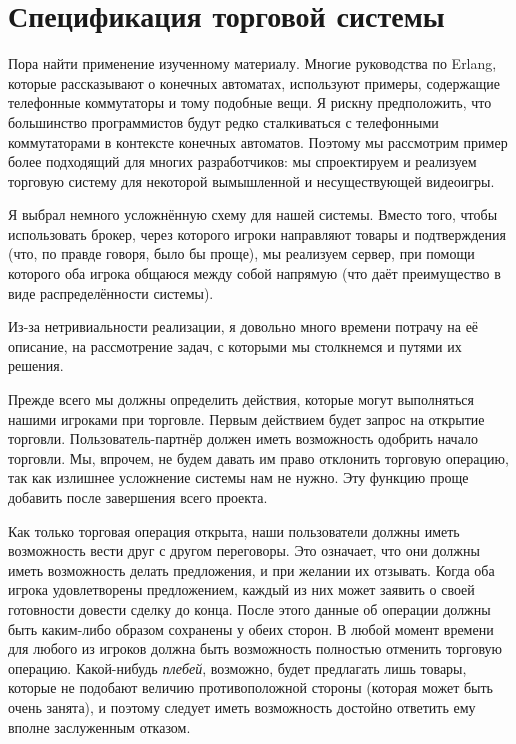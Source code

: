 \section{Спецификация торговой системы}
\label{a-trading-system-specification}

Пора найти применение изученному материалу.
Многие руководства по Erlang, которые рассказывают о конечных автоматах, используют примеры, содержащие телефонные коммутаторы и тому подобные вещи.
Я рискну предположить, что большинство программистов будут редко сталкиваться с телефонными коммутаторами в контексте конечных автоматов.
Поэтому мы рассмотрим пример более подходящий для многих разработчиков: мы спроектируем и реализуем торговую систему для некоторой вымышленной и несуществующей видеоигры.

Я выбрал немного усложнённую схему для нашей системы.
Вместо того, чтобы использовать брокер, через которого игроки направляют товары и подтверждения (что, по правде говоря, было бы проще), мы реализуем сервер, при помощи которого оба игрока общаюся между собой напрямую (что даёт преимущество в виде распределённости системы).

Из\--за нетривиальности реализации, я довольно много времени потрачу на её описание, на рассмотрение задач, с которыми мы столкнемся и путями их решения.

Прежде всего мы должны определить действия, которые могут выполняться нашими игроками при торговле.
Первым действием будет запрос на открытие торговли.
Пользователь\--партнёр должен иметь возможность одобрить начало торговли.
Мы, впрочем, не будем давать им право отклонить торговую операцию, так как излишнее усложнение системы нам не нужно.
Эту функцию проще добавить после завершения всего проекта.

Как только торговая операция открыта, наши пользователи должны иметь возможность вести друг с другом переговоры.
Это означает, что они должны иметь возможность делать предложения, и при желании их отзывать.
Когда оба игрока удовлетворены предложением, каждый из них может заявить о своей готовности довести сделку до конца.
После этого данные об операции должны быть каким\--либо образом сохранены у обеих сторон.
В любой момент времени для любого из игроков должна быть возможность полностью отменить торговую операцию.
Какой\--нибудь \emph{плебей}, возможно, будет предлагать лишь  товары, которые не подобают величию противоположной стороны (которая может быть очень занята), и поэтому следует иметь возможность достойно ответить ему вполне заслуженным отказом.


